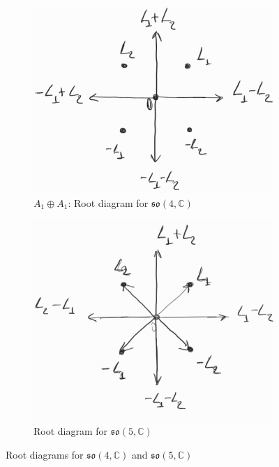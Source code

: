 \documentclass{report}
\begin{document}
\begin{figure}[h]
    \centering
    \begin{subfigure}[b]{0.4\textwidth}
        \centering
        \includegraphics[width=\textwidth]{root_diagram_a1+a_1.jpg}
        \caption{$A_1 \oplus A_1$: Root diagram for $\mathfrak{so}(4, \mathbb C)$}
        \label{fig:root_diagram_so_4_C}
    \end{subfigure}
    \hfill
    \begin{subfigure}[b]{0.4\textwidth}
        \centering
        \includegraphics[width=\textwidth]{root_diagram_so(5,C).jpg}
        \caption{Root diagram for $\mathfrak{so}(5, \mathbb C)$}
        \label{fig:root_diagram_so_5_C}
    \end{subfigure}
    \caption{Root diagrams for $\mathfrak{so}(4, \mathbb C)$ and $\mathfrak{so}(5, \mathbb C)$}
\end{figure}
\end{document}
